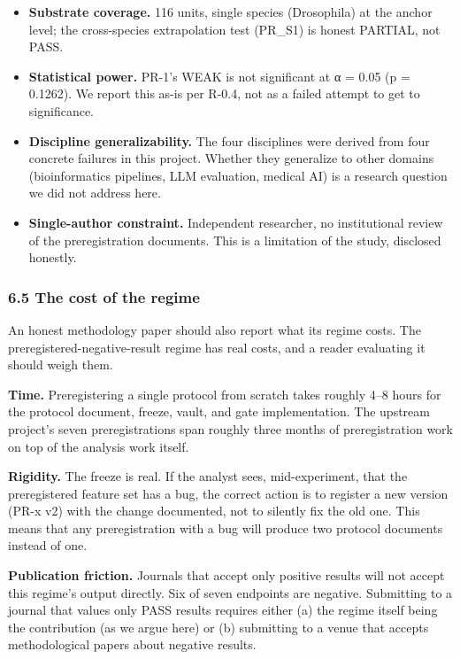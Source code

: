 \documentclass[
]{article}
\providecommand{\tightlist}{%
  \setlength{\itemsep}{0pt}\setlength{\parskip}{0pt}}
\begin{document}
\begin{itemize}
\tightlist
\item
  \textbf{Substrate coverage.} 116 units, single species (Drosophila) at
  the anchor level; the cross-species extrapolation test (PR\_S1) is
  honest PARTIAL, not PASS.
\item
  \textbf{Statistical power.} PR-1's WEAK is not significant at α = 0.05
  (p = 0.1262). We report this as-is per R-0.4, not as a failed attempt
  to get to significance.
\item
  \textbf{Discipline generalizability.} The four disciplines were
  derived from four concrete failures in this project. Whether they
  generalize to other domains (bioinformatics pipelines, LLM evaluation,
  medical AI) is a research question we did not address here.
\item
  \textbf{Single-author constraint.} Independent researcher, no
  institutional review of the preregistration documents. This is a
  limitation of the study, disclosed honestly.
\end{itemize}

\subsubsection{6.5 The cost of the regime}\label{the-cost-of-the-regime}

An honest methodology paper should also report what its regime costs.
The preregistered-negative-result regime has real costs, and a reader
evaluating it should weigh them.

\textbf{Time.} Preregistering a single protocol from scratch takes
roughly 4--8 hours for the protocol document, freeze, vault, and gate
implementation. The upstream project's seven preregistrations span
roughly three months of preregistration work on top of the analysis work
itself.

\textbf{Rigidity.} The freeze is real. If the analyst sees,
mid-experiment, that the preregistered feature set has a bug, the
correct action is to register a new version (PR-x v2) with the change
documented, not to silently fix the old one. This means that any
preregistration with a bug will produce two protocol documents instead
of one.

\textbf{Publication friction.} Journals that accept only positive
results will not accept this regime's output directly. Six of seven
endpoints are negative. Submitting to a journal that values only PASS
results requires either (a) the regime itself being the contribution (as
we argue here) or (b) submitting to a venue that accepts methodological
papers about negative results.
\end{document}
